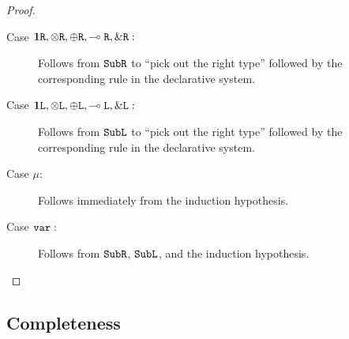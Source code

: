 \begin{proof}
\begin{description}
    \item[Case $\mathbf{1}\texttt{R}, \otimes\texttt{R}, \oplus\texttt{R}, \multimap\texttt{R}, \&\texttt{R} :$] Follows from $\texttt{Sub}\texttt{R}$ to ``pick out the right type'' followed by the corresponding rule in the declarative system.
    \item[Case $\mathbf{1}\texttt{L}, \otimes\texttt{L}, \oplus\texttt{L}, \multimap\texttt{L}, \&\texttt{L} :$] Follows from $\texttt{Sub}\texttt{L}$ to ``pick out the right type'' followed by the corresponding rule in the declarative system.
    \item[Case $\mu :$] Follows immediately from the induction hypothesis.
    \item[Case $\texttt{var} :$] Follows from $\texttt{Sub}\texttt{R}$, $\texttt{Sub}\texttt{L}$, and the induction hypothesis.
  \end{description}
\end{proof}


\subsection{Completeness}

